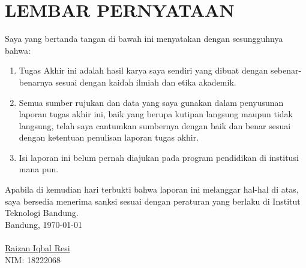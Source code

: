 \chapter*{LEMBAR PERNYATAAN}
\vspace{2cm}
Saya yang bertanda tangan di bawah ini menyatakan dengan sesungguhnya bahwa:
\begin{enumerate}
    \item Tugas Akhir ini adalah hasil karya saya sendiri yang dibuat dengan sebenar-benarnya sesuai dengan kaidah ilmiah dan etika akademik.
    \item Semua sumber rujukan dan data yang saya gunakan dalam penyusunan laporan tugas akhir ini, baik yang berupa kutipan langsung maupun tidak langsung, telah saya cantumkan sumbernya dengan baik dan benar sesuai dengan ketentuan penulisan laporan tugas akhir.
    \item Isi laporan ini belum pernah diajukan pada program pendidikan di institusi mana pun.
\end{enumerate}
Apabila di kemudian hari terbukti bahwa laporan ini melanggar hal-hal di atas, saya bersedia menerima sanksi sesuai dengan peraturan yang berlaku di Institut Teknologi Bandung.
\\[2cm]
Bandung, \today\\
\\[2cm]

\underline{Raizan Iqbal Resi} \\
NIM: 18222068
  